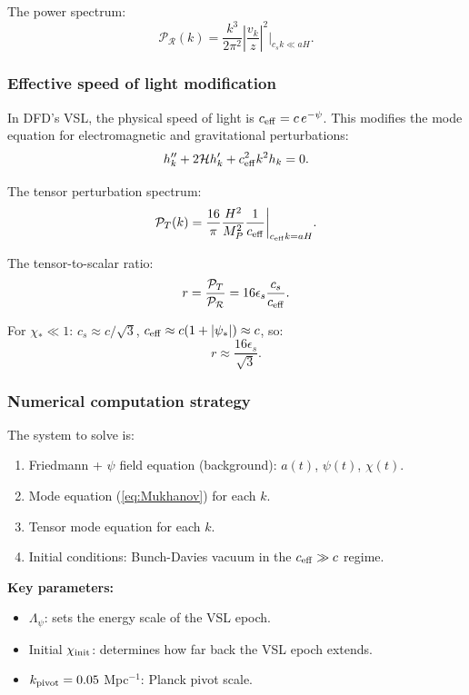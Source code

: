 \documentclass[11pt,a4paper]{article}
\begin{document}
The power spectrum:
\begin{equation}
\mathcal{P}_\mathcal{R}(k) = \frac{k^3}{2\pi^2}\left|\frac{v_k}{z}\right|^2\bigg|_{c_s k \ll aH}.
\end{equation}

\subsubsection{Effective speed of light modification}

In DFD's VSL, the physical speed of light is $c_{\rm eff} = c\,e^{-\psi}$. This modifies the mode equation for electromagnetic and gravitational perturbations:
\begin{equation}
h_k'' + 2\mathcal{H}h_k' + c_{\rm eff}^2 k^2 h_k = 0.
\end{equation}

The tensor perturbation spectrum:
\begin{equation}
\mathcal{P}_T(k) = \frac{16}{\pi}\frac{H^2}{M_P^2}\frac{1}{c_{\rm eff}}\bigg|_{c_{\rm eff}k = aH}.
\end{equation}

The tensor-to-scalar ratio:
\begin{equation}
r = \frac{\mathcal{P}_T}{\mathcal{P}_\mathcal{R}} = 16\epsilon_s\frac{c_s}{c_{\rm eff}}.
\end{equation}

For $\chi_* \ll 1$: $c_s \approx c/\sqrt{3}$, $c_{\rm eff} \approx c(1 + |\psi_*|) \approx c$, so:
\begin{equation}
r \approx \frac{16\epsilon_s}{\sqrt{3}}.
\end{equation}

\subsubsection{Numerical computation strategy}

The system to solve is:
\begin{enumerate}
\item Friedmann + $\psi$ field equation (background): $a(t)$, $\psi(t)$, $\chi(t)$.
\item Mode equation (\ref{eq:Mukhanov}) for each $k$.
\item Tensor mode equation for each $k$.
\item Initial conditions: Bunch-Davies vacuum in the $c_{\rm eff} \gg c$ regime.
\end{enumerate}

\textbf{Key parameters:}
\begin{itemize}
\item $\Lambda_\psi$: sets the energy scale of the VSL epoch.
\item Initial $\chi_{\rm init}$: determines how far back the VSL epoch extends.
\item $k_{\rm pivot} = 0.05$ Mpc$^{-1}$: Planck pivot scale.
\end{itemize}
\end{document}
